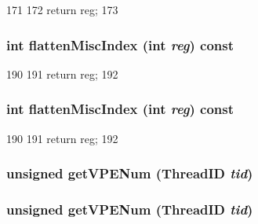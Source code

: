 \begin{DoxyCode}
171         {
172             return reg;
173         }
\end{DoxyCode}
\hypertarget{classMipsISA_1_1ISA_a8997760aa4425793911f57440a4dd8ae}{
\subsubsection[{flattenMiscIndex}]{\setlength{\rightskip}{0pt plus 5cm}int flattenMiscIndex (int {\em reg}) const}}
\label{classMipsISA_1_1ISA_a8997760aa4425793911f57440a4dd8ae}



\begin{DoxyCode}
190         {
191             return reg;
192         }
\end{DoxyCode}
\hypertarget{classMipsISA_1_1ISA_a8997760aa4425793911f57440a4dd8ae}{
\subsubsection[{flattenMiscIndex}]{\setlength{\rightskip}{0pt plus 5cm}int flattenMiscIndex (int {\em reg}) const}}
\label{classMipsISA_1_1ISA_a8997760aa4425793911f57440a4dd8ae}



\begin{DoxyCode}
190         {
191             return reg;
192         }
\end{DoxyCode}
\hypertarget{classMipsISA_1_1ISA_ac14017b7c7cddd04d2e028cde54f6165}{
\subsubsection[{getVPENum}]{\setlength{\rightskip}{0pt plus 5cm}unsigned getVPENum ({\bf ThreadID} {\em tid})}}
\label{classMipsISA_1_1ISA_ac14017b7c7cddd04d2e028cde54f6165}
\hypertarget{classMipsISA_1_1ISA_ac14017b7c7cddd04d2e028cde54f6165}{
\subsubsection[{getVPENum}]{\setlength{\rightskip}{0pt plus 5cm}unsigned getVPENum ({\bf ThreadID} {\em tid})}}
\label{classMipsISA_1_1ISA_ac14017b7c7cddd04d2e028cde54f6165}



